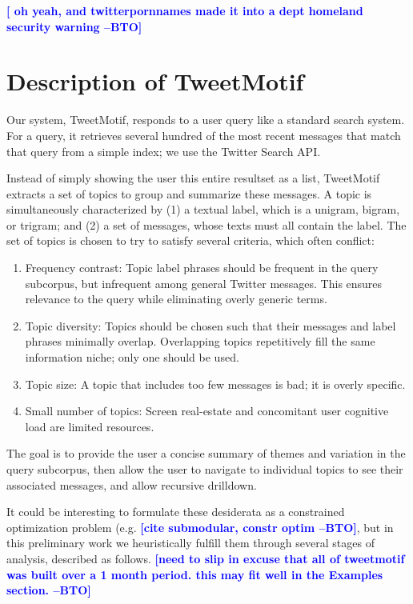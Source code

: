 \documentclass[letterpaper]{article}
\newcommand{\bto}[1]{\textcolor{blue}{\textbf{[#1 --BTO]}}}
\begin{document}
\bto { oh yeah, and twitterpornnames made it into a dept homeland security warning }


\section{Description of TweetMotif}

Our system, TweetMotif, responds to a user query like a standard search system.  For a query, it retrieves several hundred of the most recent messages that match that query from a simple index; we use the Twitter Search API.

Instead of simply showing the user this entire resultset as a list, TweetMotif extracts a set of topics to group and summarize these messages.  A topic is simultaneously characterized by (1) a textual label, which is a unigram, bigram, or trigram; and (2) a set of messages, whose texts must all contain the label.  The set of topics is chosen to try to satisfy several criteria, which often conflict:

\begin{enumerate}
\item Frequency contrast: Topic label phrases should be frequent in the query subcorpus, but infrequent among general Twitter messages.  This ensures relevance to the query while eliminating overly generic terms.
\item Topic diversity: Topics should be chosen such that their messages and label phrases minimally overlap.  Overlapping topics repetitively fill the same information niche; only one should be used.
\item Topic size: A topic that includes too few messages is bad; it is overly specific.
\item Small number of topics: Screen real-estate and concomitant user cognitive load are limited resources.
\end{enumerate}

The goal is to provide the user a concise summary of themes and variation in the query subcorpus, then allow the user to navigate to individual topics to see their associated messages, and allow recursive drilldown.

It could be interesting to formulate these desiderata as a constrained optimization problem (e.g. \bto{cite submodular, constr optim}, but in this preliminary work we heuristically fulfill them through several stages of analysis, described as follows.  \bto{need to slip in excuse that all of tweetmotif was built over a 1 month period.  this may fit well in the Examples section.}
\end{document}

